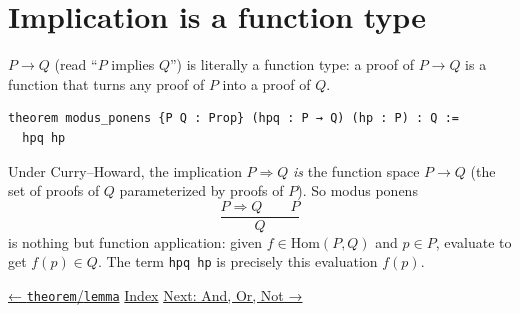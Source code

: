 \section{Implication is a function type}\label{sec:03-propositions-and-proofs:04-implication:1}

\(P \to Q\) (read ``\(P\) implies \(Q\)'') is literally a function type: a proof of \(P \to Q\) is a function that turns any proof of \(P\) into a proof of \(Q\).

\begin{lstlisting}
theorem modus_ponens {P Q : Prop} (hpq : P → Q) (hp : P) : Q :=
  hpq hp
\end{lstlisting}

\begin{mathreading}

Under Curry--Howard, the implication \(P \Rightarrow
Q\) \emph{is} the function space \(P \to Q\) (the set of proofs of \(Q\) parameterized by proofs of \(P\)). So modus ponens \[
\frac{P \Rightarrow Q \qquad P}{Q}
\] is nothing but function application: given \(f \in \mathrm{Hom}(P, Q)\) and \(p \in P\), evaluate to get \(f(p) \in Q\). The term \texttt{hpq hp} is precisely this evaluation \(f(p)\).

\end{mathreading}

\hyperref[sec:03-propositions-and-proofs:03-theorem-lemma:1]{← \texttt{theorem}/\texttt{lemma}} \textbar{} \hyperref[sec:03-propositions-and-proofs:00-index:1]{Index} \textbar{} \hyperref[sec:03-propositions-and-proofs:05-and-or-not:1]{Next: And, Or, Not →}
